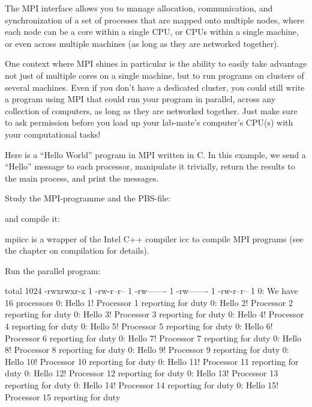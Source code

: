 The MPI interface allows you to manage allocation, communication, and
synchronization of a set of processes that are mapped onto multiple nodes,
where each node can be a core within a single CPU, or CPUs within a single
machine, or even across multiple machines (as long as they are networked
together).

One context where MPI shines in particular is the ability to easily take
advantage not just of multiple cores on a single machine, but to run programs
on clusters of several machines. Even if you don't have a dedicated cluster,
you could still write a program using MPI that could run your program in
parallel, across any collection of computers, as long as they are networked
together. Just make sure to ask permission before you load up your lab-mate's
computer's CPU(s) with your computational tasks!

Here is a ``Hello World'' program in MPI written in C. In this example, we send a
``Hello'' message to each processor, manipulate it trivially, return the results
to the main process, and print the messages.

Study the MPI-programme and the PBS-file:


and compile it:

\begin{prompt}
\end{prompt}

mpiicc is a wrapper of the Intel C++ compiler icc to compile MPI programs (see
the chapter on compilation for details).

Run the parallel program:

\begin{prompt}
total 1024
-rwxrwxr-x 1 %
-rw-r--r-- 1 %
-rw------- 1 %
-rw------- 1 %
-rw-r--r-- 1 %
0: We have 16 processors
0: Hello 1! Processor 1 reporting for duty
0: Hello 2! Processor 2 reporting for duty
0: Hello 3! Processor 3 reporting for duty
0: Hello 4! Processor 4 reporting for duty
0: Hello 5! Processor 5 reporting for duty
0: Hello 6! Processor 6 reporting for duty
0: Hello 7! Processor 7 reporting for duty
0: Hello 8! Processor 8 reporting for duty
0: Hello 9! Processor 9 reporting for duty
0: Hello 10! Processor 10 reporting for duty
0: Hello 11! Processor 11 reporting for duty
0: Hello 12! Processor 12 reporting for duty
0: Hello 13! Processor 13 reporting for duty
0: Hello 14! Processor 14 reporting for duty
0: Hello 15! Processor 15 reporting for duty
\end{prompt}

